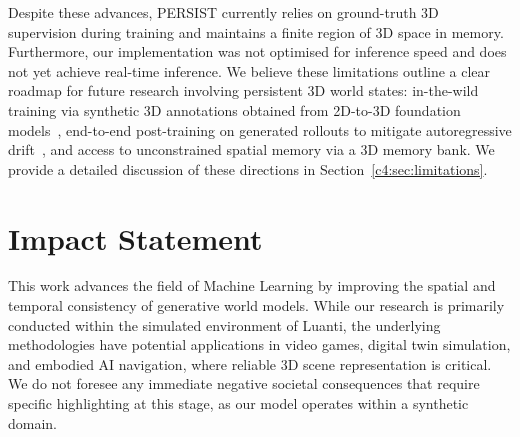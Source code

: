 Despite these advances, PERSIST currently relies on ground-truth 3D supervision during training and maintains a finite region of 3D space in memory. Furthermore, our implementation was not optimised for inference speed and does not yet achieve real-time inference. We believe these limitations outline a clear roadmap for future research involving persistent 3D world states: in-the-wild training via synthetic 3D annotations obtained from 2D-to-3D foundation models~\citep{wang2025vggt,sam3dteam2025sam3d3dfyimages}, end-to-end post-training on generated rollouts to mitigate autoregressive drift~\citep{huang2025self}, and access to unconstrained spatial memory via a 3D memory bank. We provide a detailed discussion of these directions in Section~\ref{c4:sec:limitations}.

\section*{Impact Statement}

This work advances the field of Machine Learning by improving the spatial and temporal consistency of generative world models.
While our research is primarily conducted within the simulated environment of Luanti, the underlying methodologies have potential applications in video games, digital twin simulation, and embodied AI navigation, where reliable 3D scene representation is critical.
We do not foresee any immediate negative societal consequences that require specific highlighting at this stage, as our model operates within a synthetic domain.



